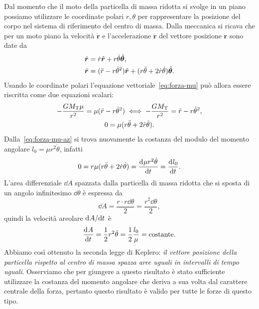 Dal momento che il moto della particella di massa ridotta si svolge in un piano
possiamo utilizzare le coordinate polari $r,\theta$ per rappresentare la
posizione del corpo nel sistema di riferimento del centro di massa. Dalla
meccanica si ricava che per un moto piano la velocità $\dot{\bm{r}}$ e
l'accelerazione $\ddot{\bm{r}}$ del vettore posizione $\bm{r}$ sono date da
\begin{subequations}
  \begin{align} %
    \dot{\bm{r}}  &= \dot{r}\versor{r} +
    r\dot{\theta}\versor{\theta}, \label{eq:velocita-polare}\\
    \ddot{\bm{r}} &= (\ddot{r}-r\dot{\theta}^2)\versor{r} + (r\ddot{\theta} +
    2\dot{r}\dot{\theta}) \versor{\theta}.
  \end{align}
\end{subequations}
Usando le coordinate polari l'equazione vettoriale~\eqref{eq:forza-mu} può
allora essere riscritta come due equazioni scalari:
\begin{subequations}
  \begin{gather}
    -\frac{GM_\textup{T}\mu}{r^2} = \mu(\ddot{r} - r\dot{\theta}^2) \iff
    -\frac{GM_\textup{T}}{r^2}=\ddot{r}-r\dot{\theta}^2, \label{eq:forza-mu-r}\\
    0 = \mu(r\ddot{\theta} + 2\dot{r}\dot{\theta}). \label{eq:forza-mu-az}
  \end{gather}
\end{subequations}
Dalla~\eqref{eq:forza-mu-az} si trova nuovamente la costanza del modulo del
momento angolare $l_0 = \mu r^2\dot{\theta}$, infatti
\begin{equation}
  0 = r\mu(r\ddot{\theta} + 2\dot{r}\dot{\theta}) = \frac{{\mathop{}\!\mathrm{d}^{}}\mu
    r^2\dot{\theta}}{\mathop{}\!\mathrm{d} {t}^{}} = \frac{{\mathop{}\!\mathrm{d}^{}}l_0}{\mathop{}\!\mathrm{d} {t}^{}}.
\end{equation}
L'area differenziale $\dd A$ spazzata dalla particella di massa ridotta che si
sposta di un angolo infinitesimo $\dd\theta$ è espressa da
\begin{equation}
  \dd A = \frac{r\cdot r\dd\theta}{2} = \frac{r^2\dd\theta}{2},
\end{equation}
quindi la velocità areolare $\mathrm{d}^{}A / \mathrm{d} {t}^{}$ è
\begin{equation}
  \frac{{\mathop{}\!\mathrm{d}^{}}A}{\mathop{}\!\mathrm{d} {t}^{}} = \frac{1}{2}r^2\dot{\theta} = \frac{1}{2}\frac{l_0}{\mu} =
  \text{costante}.
\end{equation}
Abbiamo così ottenuto la seconda legge di Keplero: \emph{il vettore posizione
  della particella rispetto al centro di massa spazza aree uguali in intervalli
  di tempo uguali}. Osserviamo che per giungere a questo risultato è stato
sufficiente utilizzare la costanza del momento angolare che deriva a sua volta
dal carattere centrale della forza, pertanto questo risultato è valido per tutte
le forze di questo tipo.

